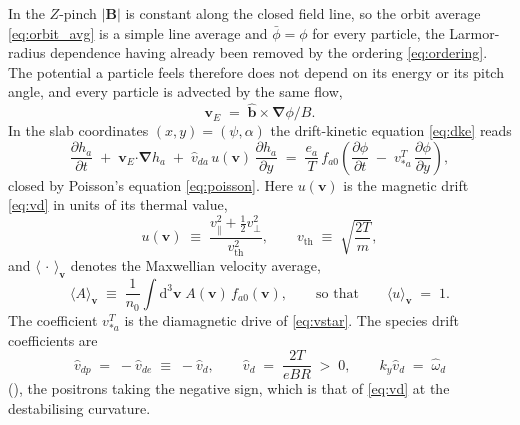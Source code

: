 \documentclass{jpp}
\newcommand{\rmd}{\text{d}}
\newcommand{\bv}{\mathbf{v}}
\newcommand{\bB}{\mathbf{B}}
\renewcommand{\vec}[1]{\boldsymbol{#1}}
\newcommand{\vec}[1]{\boldsymbol{#1}}
\newcommand{\uvec}[1]{\hat{\boldsymbol{#1}}}
\providecommand{\bcdot}{\vec{\cdot}}
\newcommand{\grad}{{\vec{\nabla}}}
\newcommand{\vperp}{v_\perp}
\newcommand{\vpar}{v_\parallel}
\newcommand{\vth}{v_\text{th}}
\begin{document}
In the $Z$-pinch $|\bB|$ is constant along the closed field line, so the orbit average \cref{eq:orbit_avg} is a simple line average and $\bar\phi = \phi$ for every particle, the Larmor-radius dependence having already been removed by the ordering \cref{eq:ordering}. The potential a particle feels therefore does not depend on its energy or its pitch angle, and every particle is advected by the same flow,
\begin{equation}\label{eq:app_fluid_vE}
\vec{v}_E \;=\; \uvec{b}\times\grad\phi/B .
\end{equation}
In the slab coordinates $(x, y) = (\psi, \alpha)$ the drift-kinetic equation \cref{eq:dke} reads
\begin{equation}\label{eq:app_fluid_dke}
\frac{\partial h_a}{\partial t} \;+\; \vec{v}_E\bcdot\grad h_a \;+\; \hat{v}_{da}\,u(\bv)\,\frac{\partial h_a}{\partial y}
\;=\; \frac{e_a}{T}\,f_{a0}\left(\frac{\partial \phi}{\partial t} \;-\; v_{*a}^T\,\frac{\partial \phi}{\partial y}\right),
\end{equation}
closed by Poisson's equation \cref{eq:poisson}. Here $u(\bv)$ is the magnetic drift \cref{eq:vd} in units of its thermal value,
\begin{equation}\label{eq:app_fluid_u}
u(\bv) \;\equiv\; \frac{\vpar^2 + \tfrac{1}{2}\vperp^2}{\vth^2} ,
\qquad
\vth \;\equiv\; \sqrt{\frac{2T}{m}} ,
\end{equation}
and $\langle\,\cdot\,\rangle_\bv$ denotes the Maxwellian velocity average,
\begin{equation}\label{eq:app_fluid_vavg}
\bigl\langle A \bigr\rangle_\bv \;\equiv\; \frac{1}{n_0}\int \rmd^3\bv\; A(\bv)\, f_{a0}(\bv) ,
\qquad\text{so that}\qquad
\bigl\langle u \bigr\rangle_\bv \;=\; 1 .
\end{equation}
The coefficient $v_{*a}^T$ is the diamagnetic drive of \cref{eq:vstar}. The species drift coefficients are
\begin{equation}\label{eq:app_fluid_vd_species}
\hat{v}_{dp} \;=\; -\hat{v}_{de} \;\equiv\; -\hat{v}_d ,
\qquad
\hat{v}_d \;=\; \frac{2T}{eBR} \;>\; 0 ,
\qquad
k_y \hat{v}_d \;=\; \hat\omega_d
\end{equation}
(), the positrons taking the negative sign, which is that of \cref{eq:vd} at the destabilising curvature.
\end{document}
